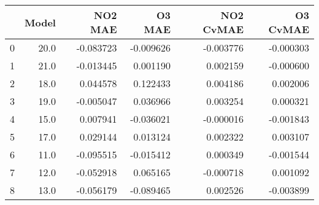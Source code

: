 \begin{tabular}{lrrrrr}
\toprule
{} &  Model &   NO2 MAE &    O3 MAE &  NO2 CvMAE &  O3 CvMAE \\
\midrule
0 &   20.0 & -0.083723 & -0.009626 &  -0.003776 & -0.000303 \\
1 &   21.0 & -0.013445 &  0.001190 &   0.002159 & -0.000600 \\
2 &   18.0 &  0.044578 &  0.122433 &   0.004186 &  0.002006 \\
3 &   19.0 & -0.005047 &  0.036966 &   0.003254 &  0.000321 \\
4 &   15.0 &  0.007941 & -0.036021 &  -0.000016 & -0.001843 \\
5 &   17.0 &  0.029144 &  0.013124 &   0.002322 &  0.003107 \\
6 &   11.0 & -0.095515 & -0.015412 &   0.000349 & -0.001544 \\
7 &   12.0 & -0.052918 &  0.065165 &  -0.000718 &  0.001092 \\
8 &   13.0 & -0.056179 & -0.089465 &   0.002526 & -0.003899 \\
\bottomrule
\end{tabular}
